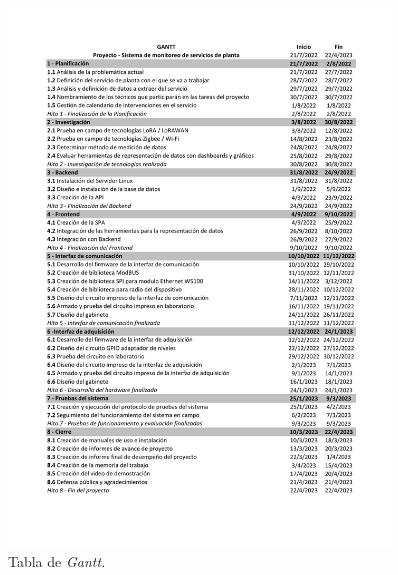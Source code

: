 \documentclass[
11pt%
]{charter}
\begin{document}
\begin{figure}[H]
\centering

\includegraphics[width=0.9\textwidth]{./Figuras/tablagantt.pdf}

\caption{Tabla de \textit{Gantt.}}
\label{fig:gantt1}
\end{figure}
\end{document}
